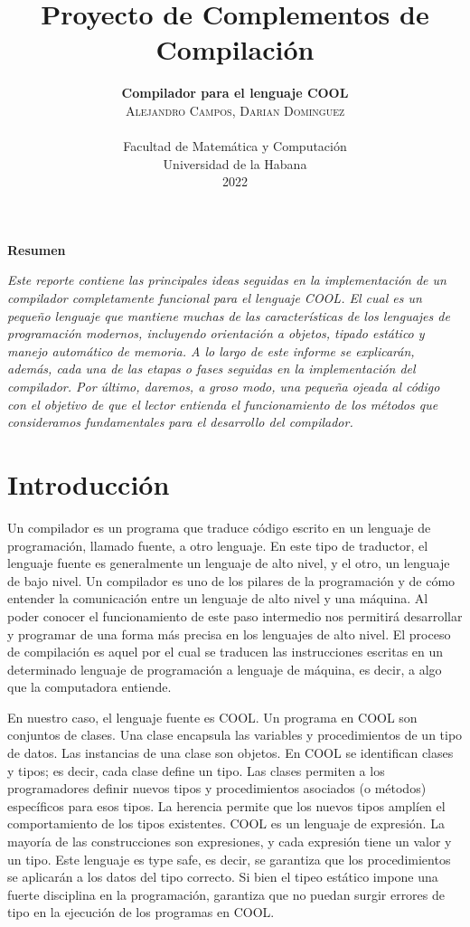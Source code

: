\documentclass[twoside]{article}
\title{\vspace{-15mm}\fontsize{20pt}{10pt}\selectfont\textbf{Proyecto de Complementos de Compilaci\'on}}
\author{
\large
\textbf{\large Compilador para el lenguaje COOL} \\[1.5cm]
\textsc{Alejandro Campos, Darian Dominguez}\\\\[2mm]
\normalsize Facultad de Matem\'atica y Computaci\'on \\
\normalsize Universidad de la Habana \\
\normalsize 2022 \\[2cm]
\vspace{-5mm}
}
\date{}
\begin{document}
\maketitle

\thispagestyle{fancy} 

\begin{center}
\textbf{Resumen}
\end{center}
\noindent \textit{Este reporte contiene las principales ideas seguidas en la implementaci\'on de un compilador completamente funcional para el lenguaje COOL. El cual es un peque\~no lenguaje que mantiene muchas de las caracter\'isticas de los lenguajes de programaci\'on modernos, incluyendo orientaci\'on a objetos, tipado est\'atico y manejo autom\'atico de memoria. A lo largo de este informe se explicar\'an, adem\'as, cada una de las etapas o fases seguidas en la implementaci\'on del compilador. Por \'ultimo, daremos, a groso modo, una peque\~na ojeada al c\'odigo con el objetivo de que el lector entienda el funcionamiento de los m\'etodos que consideramos fundamentales para el desarrollo del compilador.}\\[0.5cm]

\section{Introducci\'on}
Un compilador es un programa que traduce c\'odigo escrito en un lenguaje de programaci\'on, llamado fuente, a otro lenguaje. En este tipo de traductor, el lenguaje fuente es generalmente un lenguaje de alto nivel, y el otro, un lenguaje de bajo nivel. Un compilador es uno de los pilares de la programaci\'on y de c\'omo entender la comunicaci\'on entre un lenguaje de alto nivel y una m\'aquina. Al poder conocer el funcionamiento de este paso intermedio nos permitir\'a desarrollar y programar de una forma m\'as precisa en los lenguajes de alto nivel. El proceso de compilaci\'on es aquel por el cual se traducen las instrucciones escritas en un determinado lenguaje de programaci\'on a lenguaje de m\'aquina, es decir, a algo que la computadora entiende.

En nuestro caso, el lenguaje fuente es COOL. Un programa en COOL son conjuntos de clases. Una clase encapsula las variables y procedimientos de un tipo de datos. Las instancias de una clase son objetos. En COOL se identifican clases y tipos; es decir, cada clase define un tipo. Las clases permiten a los programadores definir nuevos tipos y procedimientos asociados (o m\'etodos) espec\'ificos para esos tipos. La herencia permite que los nuevos tipos ampl\'ien el comportamiento de los tipos existentes. COOL es un lenguaje de expresi\'on. La mayor\'ia de las construcciones son expresiones, y cada expresi\'on tiene un valor y un tipo. Este lenguaje es type safe, es decir, se garantiza que los procedimientos se aplicar\'an a los datos del tipo correcto. Si bien el tipeo est\'atico impone una fuerte disciplina en la programaci\'on, garantiza que no puedan surgir errores de tipo en la ejecuci\'on de los programas en COOL.
\end{document}
